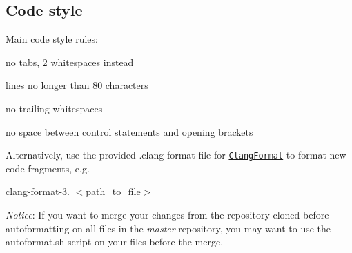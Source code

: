 \subsection*{Code style}

Main code style rules\+:


\begin{DoxyItemize}
\item no tabs, 2 whitespaces instead
\item lines no longer than 80 characters
\item no trailing whitespaces
\item no space between control statements and opening brackets
\end{DoxyItemize}

Alternatively, use the provided {\ttfamily .clang-\/format} file for \href{https://clang.llvm.org/docs/ClangFormat.html}{\tt Clang\+Format} to format new code fragments, e.\+g.

clang-\/format-\/3. $<$path\+\_\+to\+\_\+file$>$

{\itshape Notice}\+: If you want to merge your changes from the repository cloned before autoformatting on all files in the {\itshape master} repository, you may want to use the {\ttfamily autoformat.\+sh} script on your files before the merge. 
